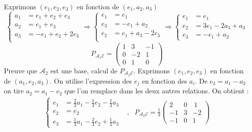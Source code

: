 \begin{enumerate}
Exprimons $(e_1,e_2,e_3)$ en fonction de $(e_1,a_2,a_3)$
\begin{displaymath}
\left\lbrace \begin{aligned}
a_1 &= e_1 + e_2 + e_3 \\
a_2 &= e_1       + e_3 \\
a_3 &= -e_1 + e_2 + 2e_3 \\
\end{aligned} \right. 
\Rightarrow
\left\lbrace \begin{aligned}
e_1 &= e_1 \\
e_3 &= -e_1  + a_2 \\
e_2 &= e_1 + a_3 - 2e_3 \\
\end{aligned} \right.  
\Rightarrow
\left\lbrace \begin{aligned}
e_1 &= e_1 \\
e_2 &= 3e_1 - 2a_3 + a_3 \\
e_3 &= -e_1  + a_2 
\end{aligned} \right. 
\end{displaymath}
\begin{displaymath}
 P_{\mathcal A_1 \mathcal E} = 
\begin{pmatrix}
 1 & 3 & -1 \\
0 & -2 & 1 \\
0 & 1 & 0
\end{pmatrix} 
\end{displaymath}
Preuve que $\mathcal A_2$ est une base, calcul de $P_{\mathcal A_2 \mathcal E}$.\newline
Exprimons $(e_1,e_2,e_3)$ en fonction de $(a_1,e_2,a_3)$. On utilise l'expression des $e_j$ en fonction des $a_i$. De $e_2=a_1 - a_2$ on tire $a_2=a_1 -e_2$ que l'on remplace dans les deux autres relations. On obtient :
\begin{align*}
 \left\lbrace
\begin{array}{cc}
e_1 &= \frac{2}{3}a_1 -\frac{1}{3}e_2 -\frac{1}{3}a_3 \\
e_2 &= e_2 \\
e_3 &=  \frac{1}{3}a_1 -\frac{2}{3}e_2 +\frac{1}{3}a_3
\end{array}
 \right. 
&,&
 P_{\mathcal A_2 \mathcal E} = \frac{1}{3}
\begin{pmatrix}
 2 & 0 & \ 1 \\
- 1 & 3 & -2\\
-1 & 0 & 1
\end{pmatrix}
\end{align*}


\end{enumerate}
